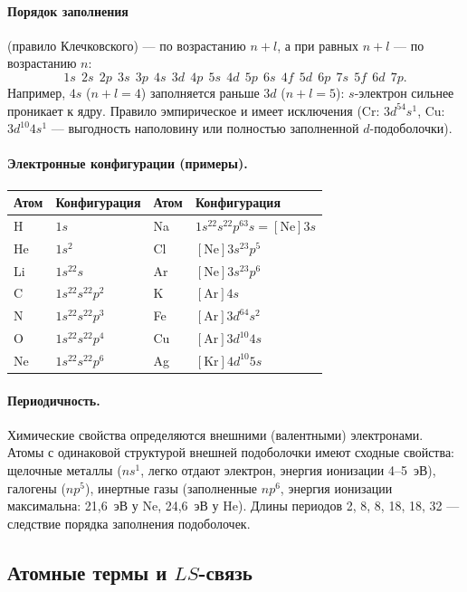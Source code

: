 \paragraph{Порядок заполнения} (правило Клечковского) — по возрастанию $n+l$, а при равных $n+l$ — по
возрастанию $n$:
\[
  1s\ \ 2s\ \ 2p\ \ 3s\ \ 3p\ \ 4s\ \ 3d\ \ 4p\ \ 5s\ \ 4d\ \ 5p\ \ 6s\ \ 4f\ \ 5d\ \ 6p\ \ 7s\ \ 5f\ \ 6d\ \ 7p .
\]
Например, $4s$ ($n+l=4$) заполняется раньше $3d$ ($n+l=5$): $s$-электрон сильнее проникает к ядру. Правило
эмпирическое и имеет исключения (Cr: $3d^54s^1$, Cu: $3d^{10}4s^1$ — выгодность наполовину или полностью
заполненной $d$-подоболочки).

\paragraph{Электронные конфигурации (примеры).}
\begin{center}
\small
\begin{tabular}{@{}llll@{}}
\toprule
Атом & Конфигурация & Атом & Конфигурация \\
\midrule
H & $1s$ & Na & $1s^22s^22p^63s=[\mathrm{Ne}]3s$ \\
He & $1s^2$ & Cl & $[\mathrm{Ne}]3s^23p^5$ \\
Li & $1s^22s$ & Ar & $[\mathrm{Ne}]3s^23p^6$ \\
C & $1s^22s^22p^2$ & K & $[\mathrm{Ar}]4s$ \\
N & $1s^22s^22p^3$ & Fe & $[\mathrm{Ar}]3d^64s^2$ \\
O & $1s^22s^22p^4$ & Cu & $[\mathrm{Ar}]3d^{10}4s$ \\
Ne & $1s^22s^22p^6$ & Ag & $[\mathrm{Kr}]4d^{10}5s$ \\
\bottomrule
\end{tabular}
\end{center}

\paragraph{Периодичность.} Химические свойства определяются внешними (валентными) электронами. Атомы с
одинаковой структурой внешней подоболочки имеют сходные свойства: щелочные металлы ($ns^1$, легко
отдают электрон, энергия ионизации 4--5~эВ), галогены ($np^5$), инертные газы (заполненные $np^6$, энергия
ионизации максимальна: 21,6~эВ у Ne, 24,6~эВ у He). Длины периодов 2, 8, 8, 18, 18, 32 — следствие порядка
заполнения подоболочек.

\subsection{Атомные термы и $LS$-связь}

